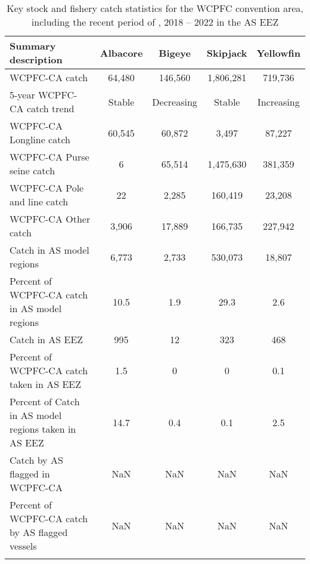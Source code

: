 \begin{longtable}{lcccc}
\caption{Key stock and fishery catch statistics for the WCPFC convention area, including the recent period of , 2018 -- 2022 in the AS EEZ} \\ 
  \hline
Summary description & Albacore & Bigeye & Skipjack & Yellowfin \\ 
  \hline
WCPFC-CA catch & 64,480 & 146,560 & 1,806,281 & 719,736 \\ 
  5-year WCPFC-CA catch trend & Stable & Decreasing & Stable & Increasing \\ 
  WCPFC-CA Longline catch & 60,545 & 60,872 & 3,497 & 87,227 \\ 
  WCPFC-CA Purse seine catch & 6 & 65,514 & 1,475,630 & 381,359 \\ 
  WCPFC-CA Pole and line catch & 22 & 2,285 & 160,419 & 23,208 \\ 
  WCPFC-CA Other catch & 3,906 & 17,889 & 166,735 & 227,942 \\ 
  Catch in AS model regions & 6,773 & 2,733 & 530,073 & 18,807 \\ 
  Percent of WCPFC-CA catch in AS model regions & 10.5 & 1.9 & 29.3 & 2.6 \\ 
   \hline
Catch in AS EEZ & 995 & 12 & 323 & 468 \\ 
  Percent of WCPFC-CA catch taken in AS EEZ & 1.5 & 0 & 0 & 0.1 \\ 
  Percent of Catch in AS model regions taken in AS EEZ & 14.7 & 0.4 & 0.1 & 2.5 \\ 
  Catch by AS flagged in WCPFC-CA & NaN & NaN & NaN & NaN \\ 
  Percent of WCPFC-CA catch by AS flagged vessels & NaN & NaN & NaN & NaN \\ 
  \hline
\label{cat_sum_tab}
\end{longtable}
